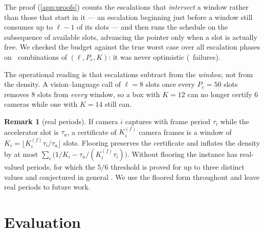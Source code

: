 \documentclass[final,5p,times,twocolumn]{elsarticle}
\theoremstyle{definition}
\newtheorem{remark}[theorem]{Remark}
\newcommand{\Ki}{K_i}
\begin{document}
The proof (\ref{app:proofs}) counts the escalations that \emph{intersect} a window rather than
those that start in it --- an escalation beginning just before a window still consumes up to
$\ell-1$ of its slots --- and then runs the schedule on the subsequence of available slots,
advancing the pointer only when a slot is actually free. We checked the budget against the true
worst case over all escalation phases on \numCfiveCells\ combinations of $(\ell,P_e,K)$: it was
never optimistic (\numCfiveFail\ failures).

The operational reading is that escalations subtract from the \emph{window}, not from the density.
A vision--language call of $\ell=8$ slots once every $P_e=50$ slots removes $8$ slots from
\emph{every} window, so a box with $K=12$ can no longer certify $6$ cameras while one with $K=14$
still can.

\begin{remark}[real periods]\label{rem:realperiods}
If camera $i$ captures with frame period $\tau_i$ while the accelerator slot is $\tau_a$, a
certificate of $K^{(f)}_i$ camera frames is a window of $\Ki=\lfloor K^{(f)}_i\tau_i/\tau_a\rfloor$
slots. Flooring preserves the certificate and inflates the density by at most
$\sum_i\big(1/\Ki-\tau_a/(K^{(f)}_i\tau_i)\big)$. Without flooring the instance has real-valued
periods, for which the $5/6$ threshold is proved for up to three distinct values and conjectured in
general \cite{fujiwara2026real}. We use the floored form throughout and leave real periods to
future work.
\end{remark}

\section{Evaluation}\label{sec:eval}
\end{document}
